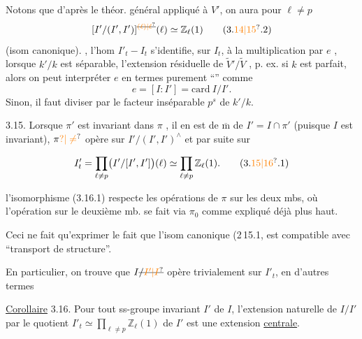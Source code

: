 Notons que d'après le théor. général appliqué à \(V'\), on aura pour   \(\ell\ne p\)
\[
 [I'/(I',I')]^{\deleted{\unsure{(\ell)|\ell}}}(\ell)\simeq\mathbb Z_\ell(1) \tag*{(3.\unsure{14|15}.2)}
\]
(isom canonique). , l'hom \(I'_t\mathrel{-}I_t\) s'identifie, sur \(I_t\), à la multiplication par \(e\) ,  lorsque \(k'/k\) est séparable,   l'extension résiduelle de \(\widetilde V'/\widetilde V\)  ,  p. ex. si \(k\) est parfait, alors on peut interpréter \(e\) en termes purement ``'' comme
\[
 e=[I:I']=\mathrm{card}\ I/I'.
\]
Sinon, il faut diviser par le facteur inséparable \(p^s\) de \(k'/k\).


3.15. Lorsque \(\pi'\) est invariant dans \(\pi\) , il en est de \(\overline{\mathrm m}\) de  \(I'=I\cap\pi'\)  (puisque \(I\) est invariant),   \(\pi\unsure{?|\ne}\) opère sur \(I'/(I',I')^\wedge\) et par suite sur


\[
 I'_t=\prod_{\ell\ne p}\bigl(I'/[I',I']\bigr)(\ell)\simeq\prod_{\ell\ne p}\mathbb Z_\ell(1). \tag*{(3.\unsure{15|16}.1)}
\]

 

 l'isomorphisme  (3.16.1) respecte les opérations de \(\pi\) sur les deux mbs, où l'opération sur le deuxième mb.  se fait via \(\pi_0\) comme expliqué déjà plus haut.

Ceci ne fait qu'exprimer le fait que l'isom canonique (2\,15.1, est compatible avec ``transport de structure''.

En particulier, on trouve que \(I\deleted{/\unsure{I'|I}}\) opère trivialement sur \(I'_t\), en d'autres termes

\uline{Corollaire} 3.16. Pour tout ss-groupe  invariant \(I'\)  de \(I\), l'extension naturelle de \(I/I'\) par le quotient \(I'_t\simeq\prod_{\ell\ne p}\mathbb Z_\ell(1)\) de \(I'\) est une extension \uline{centrale}.

